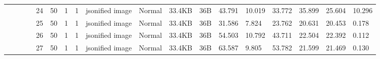 \begin{landscape}
\begin{table}[]
{\begin{tabular}{@{}ccccllllllllllllll@{}}
                                                                                   &                              &                                &                                                                                                          & 24                                                    & 50                                       & 1                                          & 1                                 & jsonified image                  & Normal                             & 33.4KB                                        & 36B                                             & 43.791                  & 10.019   & 33.772                       & 35.899                  & 25.604   & 10.296                       \\
                                                                                   &                              &                                &                                                                                                          & 25                                                    & 50                                       & 1                                          & 1                                 & jsonified image                  & Normal                             & 33.4KB                                        & 36B                                             & 31.586                  & 7.824    & 23.762                       & 20.631                  & 20.453   & 0.178                        \\
                                                                                   &                              &                                &                                                                                                          & 26                                                    & 50                                       & 1                                          & 1                                 & jsonified image                  & Normal                             & 33.4KB                                        & 36B                                             & 54.503                  & 10.792   & 43.711                       & 22.504                  & 22.392   & 0.112                        \\
                                                                                   &                              &                                &                                                                                                          & 27                                                    & 50                                       & 1                                          & 1                                 & jsonified image                  & Normal                             & 33.4KB                                        & 36B                                             & 63.587                  & 9.805    & 53.782                       & 21.599                  & 21.469   & 0.130                        \\

\end{tabular}}
\end{table}
\end{landscape}
